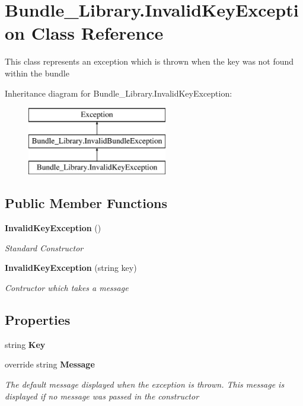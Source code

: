 \section{Bundle\+\_\+\+Library.\+Invalid\+Key\+Exception Class Reference}
\label{class_bundle___library_1_1_invalid_key_exception}


This class represents an exception which is thrown when the key was not found within the bundle  


Inheritance diagram for Bundle\+\_\+\+Library.\+Invalid\+Key\+Exception\+:\begin{figure}[H]
\begin{center}
\leavevmode
\includegraphics[height=3.000000cm]{class_bundle___library_1_1_invalid_key_exception}
\end{center}
\end{figure}
\subsection*{Public Member Functions}
\begin{DoxyCompactItemize}
\item 
{\bf Invalid\+Key\+Exception} ()
\begin{DoxyCompactList}\small\item\em Standard Constructor \end{DoxyCompactList}\item 
{\bf Invalid\+Key\+Exception} (string key)
\begin{DoxyCompactList}\small\item\em Contructor which takes a message \end{DoxyCompactList}\end{DoxyCompactItemize}
\subsection*{Properties}
\begin{DoxyCompactItemize}
\item 
string {\bfseries Key}\hspace{0.3cm}{\ttfamily  [get, set]}\label{class_bundle___library_1_1_invalid_key_exception_a78e11bc81fb6eb9a1a897256f806a357}

\item 
override string {\bf Message}\hspace{0.3cm}{\ttfamily  [get]}
\begin{DoxyCompactList}\small\item\em The default message displayed when the exception is thrown. This message is displayed if no message was passed in the constructor \end{DoxyCompactList}\end{DoxyCompactItemize}


